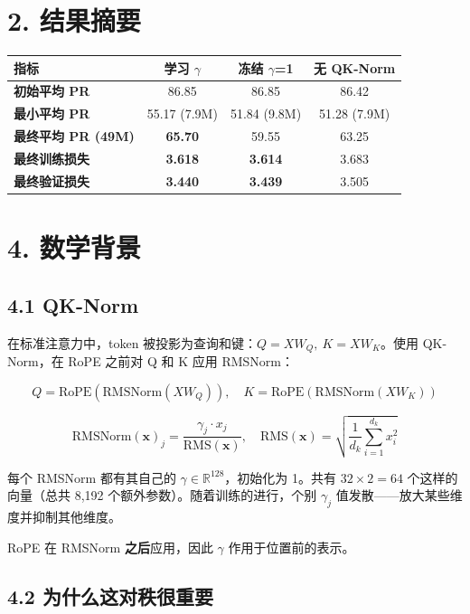 \documentclass[11pt]{ctexart}
\begin{document}
\section{2. 结果摘要}

\begin{table}[h!]
\centering
\begin{tabular}{lccc}
\toprule
\textbf{指标} & \textbf{学习 $\gamma$} & \textbf{冻结 $\gamma$=1} & \textbf{无 QK-Norm} \\
\midrule
\textbf{初始平均 PR} & 86.85 & 86.85 & 86.42 \\
\textbf{最小平均 PR} & 55.17 (7.9M) & 51.84 (9.8M) & 51.28 (7.9M) \\
\textbf{最终平均 PR (49M)} & \textbf{65.70} & 59.55 & 63.25 \\
\textbf{最终训练损失} & \textbf{3.618} & \textbf{3.614} & 3.683 \\
\textbf{最终验证损失} & \textbf{3.440} & \textbf{3.439} & 3.505 \\
\bottomrule
\end{tabular}
\end{table}

\section{4. 数学背景}

\subsection{4.1 QK-Norm}

在标准注意力中，token 被投影为查询和键：$Q = XW_Q,\ K = XW_K$。使用 QK-Norm，在 RoPE 之前对 Q 和 K 应用 RMSNorm：

$$Q = \text{RoPE}\!\left(\text{RMSNorm}(XW_Q)\right), \quad K = \text{RoPE}\!\left(\text{RMSNorm}(XW_K)\right)$$

$$\text{RMSNorm}(\mathbf{x})_j = \frac{\gamma_j \cdot x_j}{\text{RMS}(\mathbf{x})}, \quad \text{RMS}(\mathbf{x}) = \sqrt{\frac{1}{d_k}\sum_{i=1}^{d_k} x_i^2}$$

每个 RMSNorm 都有其自己的 $\gamma \in \mathbb{R}^{128}$，初始化为 1。共有 $32 \times 2 = 64$ 个这样的向量（总共 8,192 个额外参数）。随着训练的进行，个别 $\gamma_j$ 值发散——放大某些维度并抑制其他维度。

RoPE 在 RMSNorm \textbf{之后}应用，因此 $\gamma$ 作用于位置前的表示。

\subsection{4.2 为什么这对秩很重要}
\end{document}
